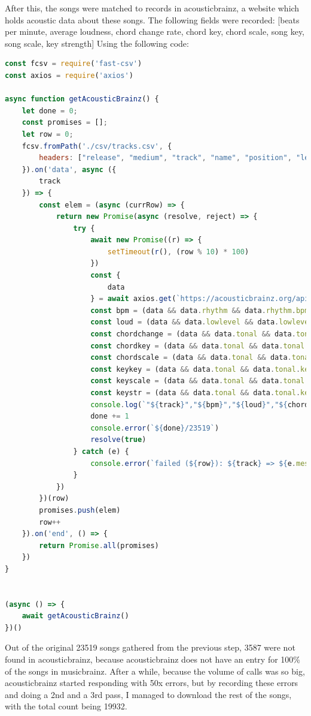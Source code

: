 \documentclass[10pt, a4paper]{article}
\begin{document}
After this, the songs were matched to records in acousticbrainz, a website which holds acoustic data about these songs. The following fields were recorded: [beats per minute, average loudness, chord change rate, chord key, chord scale, song key, song scale, key strength]
Using the following code:

\begin{lstlisting}[language=JavaScript, label=lst:acousticbrainzMatch, caption = Matching individual tracks in musicbrainz with entries in acousticbrainz ]
const fcsv = require('fast-csv')
const axios = require('axios')

async function getAcousticBrainz() {
	let done = 0;
	const promises = [];
	let row = 0;
	fcsv.fromPath('./csv/tracks.csv', {
		headers: ["release", "medium", "track", "name", "position", "length"]
	}).on('data', async ({
		track
	}) => {
		const elem = (async (currRow) => {
			return new Promise(async (resolve, reject) => {
				try {
					await new Promise((r) => {
						setTimeout(r(), (row % 10) * 100)
					})
					const {
						data
					} = await axios.get(`https://acousticbrainz.org/api/v1/${track}/low-level`)
					const bpm = (data && data.rhythm && data.rhythm.bpm) || "0"
					const loud = (data && data.lowlevel && data.lowlevel.average_loudness) || "0"
					const chordchange = (data && data.tonal && data.tonal.chords_changes_rate) || "0"
					const chordkey = (data && data.tonal && data.tonal.chords_key) || ""
					const chordscale = (data && data.tonal && data.tonal.chords_scale) || ""
					const keykey = (data && data.tonal && data.tonal.key_key) || ""
					const keyscale = (data && data.tonal && data.tonal.key_scale) || ""
					const keystr = (data && data.tonal && data.tonal.key_strength) || "0"
					console.log(`"${track}","${bpm}","${loud}","${chordkey} ${chordscale}","${chordchange}","${keykey} ${keyscale}","${keystr}"`)
					done += 1
					console.error(`${done}/23519`)
					resolve(true)
				} catch (e) {
					console.error(`failed (${row}): ${track} => ${e.message}`)
				}
			})
		})(row)
		promises.push(elem)
		row++
	}).on('end', () => {
		return Promise.all(promises)
	})
}


(async () => {
	await getAcousticBrainz()
})()
\end{lstlisting}

Out of the original 23519 songs gathered from the previous step, 3587 were not found in acousticbrainz, because acousticbrainz does not have an entry for 100\% of the songs in musicbrainz.
After a while, because the volume of calls was so big, acousticbrainz started responding with 50x errors, but by recording these errors and doing a 2nd and a 3rd pass, I managed to download the rest of the songs, with the total count being 19932.
\end{document}
